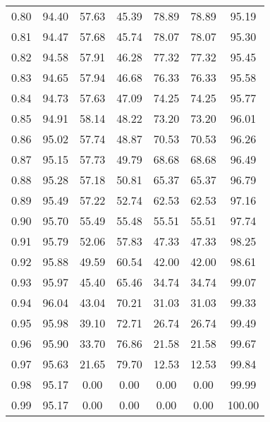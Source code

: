 \begin{tabular}{|c|c|c|c|c|c|c|}
      0.80 &     94.40 &     57.63 &      45.39 &   78.89 &      78.89 &         95.19 \\
      0.81 &     94.47 &     57.68 &      45.74 &   78.07 &      78.07 &         95.30 \\
      0.82 &     94.58 &     57.91 &      46.28 &   77.32 &      77.32 &         95.45 \\
      0.83 &     94.65 &     57.94 &      46.68 &   76.33 &      76.33 &         95.58 \\
      0.84 &     94.73 &     57.63 &      47.09 &   74.25 &      74.25 &         95.77 \\
      0.85 &     94.91 &     58.14 &      48.22 &   73.20 &      73.20 &         96.01 \\
      0.86 &     95.02 &     57.74 &      48.87 &   70.53 &      70.53 &         96.26 \\
      0.87 &     95.15 &     57.73 &      49.79 &   68.68 &      68.68 &         96.49 \\
      0.88 &     95.28 &     57.18 &      50.81 &   65.37 &      65.37 &         96.79 \\
      0.89 &     95.49 &     57.22 &      52.74 &   62.53 &      62.53 &         97.16 \\
      0.90 &     95.70 &     55.49 &      55.48 &   55.51 &      55.51 &         97.74 \\
      0.91 &     95.79 &     52.06 &      57.83 &   47.33 &      47.33 &         98.25 \\
      0.92 &     95.88 &     49.59 &      60.54 &   42.00 &      42.00 &         98.61 \\
      0.93 &     95.97 &     45.40 &      65.46 &   34.74 &      34.74 &         99.07 \\
      0.94 &     96.04 &     43.04 &      70.21 &   31.03 &      31.03 &         99.33 \\
      0.95 &     95.98 &     39.10 &      72.71 &   26.74 &      26.74 &         99.49 \\
      0.96 &     95.90 &     33.70 &      76.86 &   21.58 &      21.58 &         99.67 \\
      0.97 &     95.63 &     21.65 &      79.70 &   12.53 &      12.53 &         99.84 \\
      0.98 &     95.17 &      0.00 &       0.00 &    0.00 &       0.00 &         99.99 \\
      0.99 &     95.17 &      0.00 &       0.00 &    0.00 &       0.00 &        100.00 \\
\bottomrule
\end{tabular}
